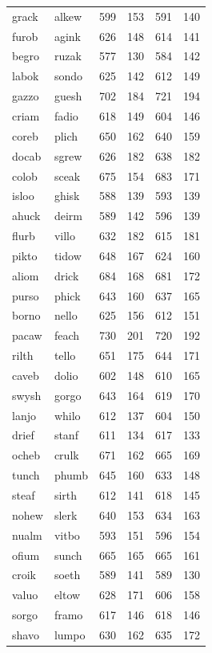 \documentclass[
]{interact}
\begin{document}
\begin{longtable*}{llrrrr}
\midrule\addlinespace[2.5pt]
grack & alkew & 599 & 153 & 591 & 140 \\ 
furob & agink & 626 & 148 & 614 & 141 \\ 
begro & ruzak & 577 & 130 & 584 & 142 \\ 
labok & sondo & 625 & 142 & 612 & 149 \\ 
gazzo & guesh & 702 & 184 & 721 & 194 \\ 
criam & fadio & 618 & 149 & 604 & 146 \\ 
coreb & plich & 650 & 162 & 640 & 159 \\ 
docab & sgrew & 626 & 182 & 638 & 182 \\ 
colob & sceak & 675 & 154 & 683 & 171 \\ 
isloo & ghisk & 588 & 139 & 593 & 139 \\ 
ahuck & deirm & 589 & 142 & 596 & 139 \\ 
flurb & villo & 632 & 182 & 615 & 181 \\ 
pikto & tidow & 648 & 167 & 624 & 160 \\ 
aliom & drick & 684 & 168 & 681 & 172 \\ 
purso & phick & 643 & 160 & 637 & 165 \\ 
borno & nello & 625 & 156 & 612 & 151 \\ 
pacaw & feach & 730 & 201 & 720 & 192 \\ 
rilth & tello & 651 & 175 & 644 & 171 \\ 
caveb & dolio & 602 & 148 & 610 & 165 \\ 
swysh & gorgo & 643 & 164 & 619 & 170 \\ 
lanjo & whilo & 612 & 137 & 604 & 150 \\ 
drief & stanf & 611 & 134 & 617 & 133 \\ 
ocheb & crulk & 671 & 162 & 665 & 169 \\ 
tunch & phumb & 645 & 160 & 633 & 148 \\ 
steaf & sirth & 612 & 141 & 618 & 145 \\ 
nohew & slerk & 640 & 153 & 634 & 163 \\ 
nualm & vitbo & 593 & 151 & 596 & 154 \\ 
ofium & sunch & 665 & 165 & 665 & 161 \\ 
croik & soeth & 589 & 141 & 589 & 130 \\ 
valuo & eltow & 628 & 171 & 606 & 158 \\ 
sorgo & framo & 617 & 146 & 618 & 146 \\ 
shavo & lumpo & 630 & 162 & 635 & 172 \\ 

\end{longtable*}
\end{document}
